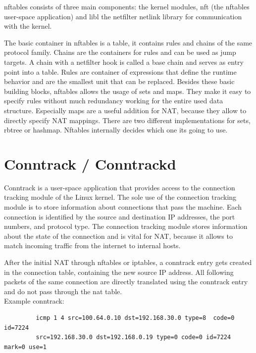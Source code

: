 \documentclass{report}
\begin{document}
nftables consists of three main components: the kernel modules, nft (the
nftables user-space application) and libl the netfilter netlink library
for communication with the kernel.

The basic container in nftables is a table, it contains rules and chains
of the same protocol family. Chains are the containers for rules and can
be used as jump targets. A chain with a netfilter hook is
called a base chain and serves as entry point into a table. Rules are
container of expressions that define the runtime behavior and are the
smallest unit that can be replaced. Besides these basic building blocks,
nftables allows the usage of sets and maps. They make it easy to specify
rules without much redundancy working for the entire used data structure.
Especially maps are a useful addition for NAT, because they allow to
directly specify NAT mappings. There are two different implementations
for sets, rbtree or hashmap. Nftables internally decides which one its
going to use.

\section{Conntrack / Conntrackd}\label{conntrack-conntrackd}

Conntrack\cite{conntrack-tools} is a user-space application that provides access to the
connection tracking module\cite{conntrackSys} of the Linux kernel. The sole use of the
connection tracking module is to store information about connections
that pass the machine. Each connection is identified by the source and
destination IP addresses, the port numbers, and protocol type. The
connection tracking module stores information about the state of the
connection and is vital for NAT, because it allows to match incoming
traffic from the internet to internal hosts.

After the initial NAT through nftables or iptables, a conntrack entry gets
created in the connection table, containing the new source IP address.
All following packets of the same connection are directly translated
using the conntrack entry and do not pass through the nat table. \\

Example conntrack:


\begin{verbatim}
         icmp 1 4 src=100.64.0.10 dst=192.168.30.0 type=8  code=0 id=7224
         src=192.168.30.0 dst=192.168.0.19 type=0 code=0 id=7224 mark=0 use=1
\end{verbatim}
\end{document}
